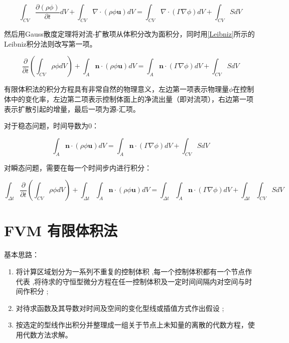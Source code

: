 \begin{equation}
\int_{CV}\frac{\partial (\rho\phi)}{\partial t}dV + \int_{CV}\nabla\cdot(\rho\phi\bm{u})dV = \int_{CV}\nabla\cdot(\Gamma\nabla\phi)dV + \int_{CV}SdV
\end{equation}

然后用Gauss散度定理将对流-扩散项从体积分改为面积分，同时用\autoref{Leibniz}所示的Leibniz积分法则改写第一项。

\begin{equation}
\frac{\partial}{\partial t}\left(\int_{CV}\rho\phi dV\right) + \int_{A}\bm{n}\cdot(\rho\phi\bm{u})dV = \int_{A}\bm{n}\cdot(\Gamma\nabla\phi)dV + \int_{CV}SdV
\end{equation}

有限体积法的积分方程具有非常自然的物理意义，左边第一项表示物理量$ \phi $在控制体中的变化率，左边第二项表示控制体面上的净流出量（即对流项），右边第一项表示扩散引起的增量，最后一项为源-汇项。

对于稳态问题，时间导数为0：

\begin{equation}
\int_{A}\bm{n}\cdot(\rho\phi\bm{u})dV = \int_{A}\bm{n}\cdot(\Gamma\nabla\phi)dV + \int_{CV}SdV
\end{equation}

对瞬态问题，需要在每一个时间步内进行积分：

\begin{equation}
\int_{\Delta t}\frac{\partial}{\partial t}\left(\int_{CV}\rho\phi dV\right) + \int_{\Delta t}\int_{A}\bm{n}\cdot(\rho\phi\bm{u})dV = \int_{\Delta t}\int_{A}\bm{n}\cdot(\Gamma\nabla\phi)dV + \int_{\Delta t}\int_{CV}SdV
\end{equation}

\section{FVM 有限体积法}

基本思路：

\begin{enumerate}
    \item 将计算区域划分为一系列不重复的控制体积 ,每一个控制体积都有一个节点作代表 ,将待求的守恒型微分方程在任一控制体积及一定时间间隔内对空间与时间作积分 ;
    \item 对待求函数及其导数对时间及空间的变化型线或插值方式作出假设 ;
    \item 按选定的型线作出积分并整理成一组关于节点上未知量的离散的代数方程，使用代数方法求解。
\end{enumerate}

